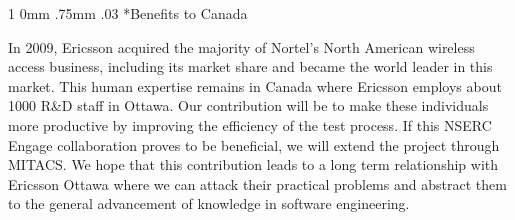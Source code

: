 \documentclass[12pt, letterpaper]{article}
\makeatletter
\renewcommand{\section}{\@startsection
{section}%
{1}%
{0mm}%
{.75mm}
{.03\baselineskip}%
{\normalfont\large\bf} %
}
\makeatother
\begin{document}
\section*{Benefits to Canada}

In 2009, Ericsson acquired the majority of Nortel's North American wireless
access business, including its market share and became the world leader in this
market. This human expertise remains in Canada where Ericsson employs about
1000 R\&D staff in Ottawa. Our contribution will be to make these individuals
more productive by improving the efficiency of the test process. If this NSERC
Engage collaboration proves to be beneficial, we will extend the project
through MITACS. We hope that this contribution leads to a long term
relationship with Ericsson Ottawa where we can attack their practical problems
and abstract them to the general advancement of knowledge in software
engineering.
\end{document}
